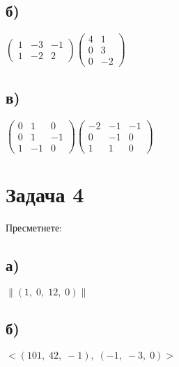 \documentclass[12pt]{article}
\begin{document}
\subsection*{б)}

$\begin{pmatrix}
    1 & -3 & -1 \\
    1 & -2 & 2
\end{pmatrix}\begin{pmatrix}
    4 & 1 \\
    0 & 3 \\
    0 & -2
\end{pmatrix}$

\subsection*{в)}

$\begin{pmatrix}
    0 & 1 & 0 \\
    0 & 1 & -1 \\
    1 & -1 & 0
\end{pmatrix} \begin{pmatrix}
    -2 & -1 & -1 \\
    0 & -1 & 0 \\
    1 & 1 & 0
\end{pmatrix}$

\section*{Задача 4}

Пресметнете:

\subsection*{а)}

$\|(1, \; 0, \; 12, \; 0)\|$

\subsection*{б)}

$<(101, \; 42, \; -1), \; (-1, \; -3, \; 0)>$
\end{document}
